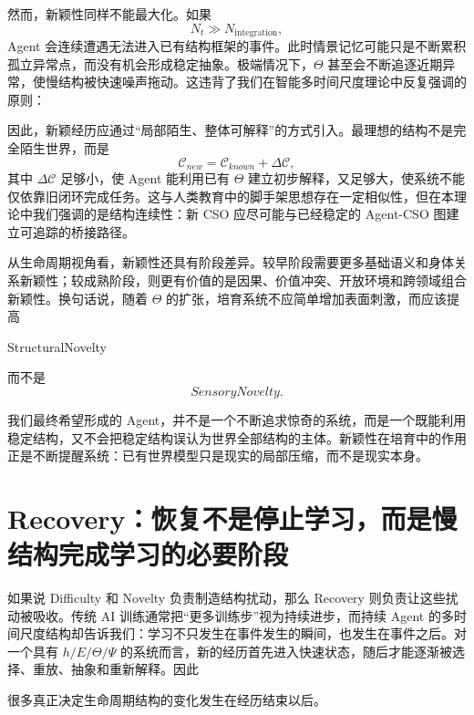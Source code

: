 然而，新颖性同样不能最大化。如果
\[
N_t
\gg
N_{\mathrm{integration}},
\]
Agent 会连续遭遇无法进入已有结构框架的事件。此时情景记忆可能只是不断累积孤立异常点，而没有机会形成稳定抽象。极端情况下，$\Theta$ 甚至会不断追逐近期异常，使慢结构被快速噪声拖动。这违背了我们在智能多时间尺度理论中反复强调的原则：
\begin{statementbox}
\centering
{}
\end{statementbox}

因此，新颖经历应通过“局部陌生、整体可解释”的方式引入。最理想的结构不是完全陌生世界，而是
\[
\mathcal C_{new}
=
\mathcal C_{known}
+
\Delta\mathcal C,
\]
其中 $\Delta\mathcal C$ 足够小，使 Agent 能利用已有 $\Theta$ 建立初步解释，又足够大，使系统不能仅依靠旧闭环完成任务。这与人类教育中的脚手架思想存在一定相似性，但在本理论中我们强调的是结构连续性：新 CSO 应尽可能与已经稳定的 Agent-CSO 图建立可追踪的桥接路径。

从生命周期视角看，新颖性还具有阶段差异。较早阶段需要更多基础语义和身体关系新颖性；较成熟阶段，则更有价值的是因果、价值冲突、开放环境和跨领域组合新颖性。换句话说，随着 $\Theta$ 的扩张，培育系统不应简单增加表面刺激，而应该提高
\begin{statementbox}
StructuralNovelty
\end{statementbox}
而不是
\[
SensoryNovelty.
\]

我们最终希望形成的 Agent，并不是一个不断追求惊奇的系统，而是一个既能利用稳定结构，又不会把稳定结构误认为世界全部结构的主体。新颖性在培育中的作用正是不断提醒系统：已有世界模型只是现实的局部压缩，而不是现实本身。

\section{Recovery：恢复不是停止学习，而是慢结构完成学习的必要阶段}

如果说 Difficulty 和 Novelty 负责制造结构扰动，那么 Recovery 则负责让这些扰动被吸收。传统 AI 训练通常把“更多训练步”视为持续进步，而持续 Agent 的多时间尺度结构却告诉我们：学习不只发生在事件发生的瞬间，也发生在事件之后。对一个具有 $h/E/\Theta/\Psi$ 的系统而言，新的经历首先进入快速状态，随后才能逐渐被选择、重放、抽象和重新解释。因此
\begin{statementbox}
\centering
{}
\end{statementbox}
很多真正决定生命周期结构的变化发生在经历结束以后。

